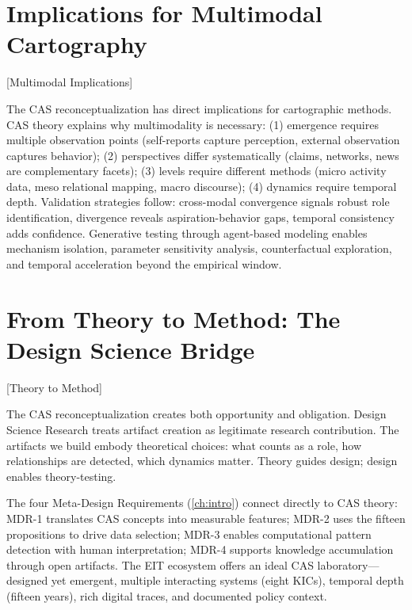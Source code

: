 \documentclass[../main.tex]{subfiles}
\begin{document}
\section{Implications for Multimodal Cartography}[Multimodal Implications]

The CAS reconceptualization has direct implications for cartographic methods. CAS theory explains why multimodality is necessary: (1) emergence requires multiple observation points (self-reports capture perception, external observation captures behavior); (2) perspectives differ systematically (claims, networks, news are complementary facets); (3) levels require different methods (micro activity data, meso relational mapping, macro discourse); (4) dynamics require temporal depth. Validation strategies follow: cross-modal convergence signals robust role identification, divergence reveals aspiration-behavior gaps, temporal consistency adds confidence. Generative testing through agent-based modeling enables mechanism isolation, parameter sensitivity analysis, counterfactual exploration, and temporal acceleration beyond the empirical window.


\section{From Theory to Method: The Design Science Bridge}[Theory to Method]

The CAS reconceptualization creates both opportunity and obligation. Design Science Research treats artifact creation as legitimate research contribution. The artifacts we build embody theoretical choices: what counts as a role, how relationships are detected, which dynamics matter. Theory guides design; design enables theory-testing.

The four Meta-Design Requirements (\cref{ch:intro}) connect directly to CAS theory: MDR-1 translates CAS concepts into measurable features; MDR-2 uses the fifteen propositions to drive data selection; MDR-3 enables computational pattern detection with human interpretation; MDR-4 supports knowledge accumulation through open artifacts. The EIT ecosystem offers an ideal CAS laboratory---designed yet emergent, multiple interacting systems (eight KICs), temporal depth (fifteen years), rich digital traces, and documented policy context.
\end{document}
